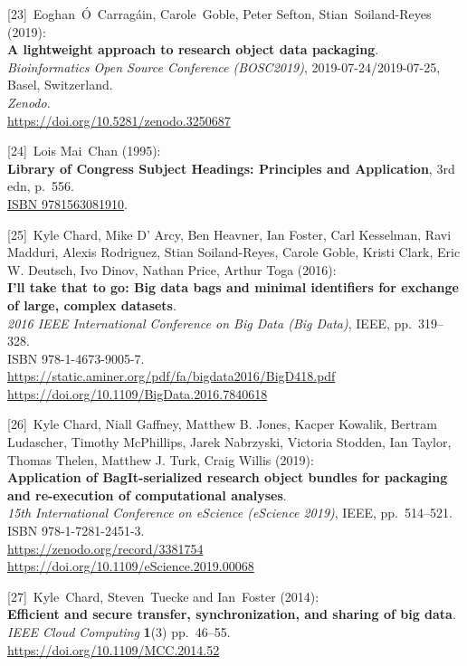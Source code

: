 {[}23{]}~Eoghan~Ó~Carragáin, Carole~Goble, Peter Sefton,
Stian~Soiland-Reyes (2019):\\
\textbf{A lightweight approach to research object data packaging}.\\
\emph{Bioinformatics Open Source Conference (BOSC2019)},
2019-07-24/2019-07-25, Basel, Switzerland.\\
\emph{Zenodo}.\\
\url{https://doi.org/10.5281/zenodo.3250687}

{[}24{]}~Lois Mai~Chan (1995):\\
\textbf{Library of Congress Subject Headings: Principles and
Application}, 3rd edn, p.~556.\\
\href{https://identifiers.org/isbn/9781563081910}{ISBN 9781563081910}.

{[}25{]}~Kyle Chard, Mike D' Arcy, Ben Heavner, Ian Foster, Carl
Kesselman, Ravi Madduri, Alexis Rodriguez, Stian Soiland-Reyes, Carole
Goble, Kristi Clark, Eric W. Deutsch, Ivo Dinov, Nathan Price, Arthur
Toga (2016):\\
\textbf{I'll take that to go: Big data bags and minimal identifiers for
exchange of large, complex datasets}.\\
\emph{2016 IEEE International Conference on Big Data (Big Data)}, IEEE,
pp.~319--328.\\
ISBN 978-1-4673-9005-7.\\
\url{https://static.aminer.org/pdf/fa/bigdata2016/BigD418.pdf}~\\
\url{https://doi.org/10.1109/BigData.2016.7840618}

{[}26{]}~Kyle Chard, Niall Gaffney, Matthew B. Jones, Kacper Kowalik,
Bertram Ludascher, Timothy McPhillips, Jarek Nabrzyski, Victoria
Stodden, Ian Taylor, Thomas Thelen, Matthew J. Turk, Craig Willis
(2019):\\
\textbf{Application of BagIt-serialized research object bundles for
packaging and re-execution of computational analyses}.\\
\emph{15th International Conference on eScience (eScience 2019)}, IEEE,
pp.~514--521.\\
ISBN 978-1-7281-2451-3.\\
\url{https://zenodo.org/record/3381754}~\\
\url{https://doi.org/10.1109/eScience.2019.00068}

{[}27{]}~Kyle~Chard, Steven~Tuecke and Ian~Foster (2014):\\
\textbf{Efficient and secure transfer, synchronization, and sharing of
big data}.\\
\emph{IEEE Cloud Computing} \textbf{1}(3) pp.~46--55.\\
\url{https://doi.org/10.1109/MCC.2014.52}

